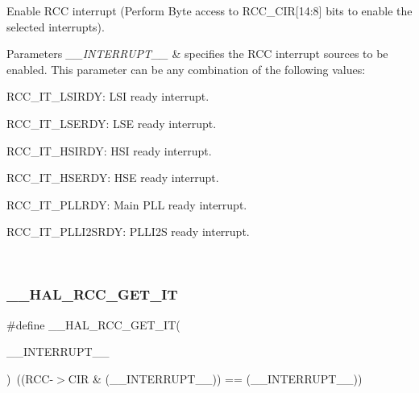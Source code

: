 Enable R\+CC interrupt (Perform Byte access to R\+C\+C\+\_\+\+C\+IR\mbox{[}14\+:8\mbox{]} bits to enable the selected interrupts). 


\begin{DoxyParams}{Parameters}
{\em \+\_\+\+\_\+\+I\+N\+T\+E\+R\+R\+U\+P\+T\+\_\+\+\_\+} & specifies the R\+CC interrupt sources to be enabled. This parameter can be any combination of the following values\+: \begin{DoxyItemize}
\item R\+C\+C\+\_\+\+I\+T\+\_\+\+L\+S\+I\+R\+DY\+: L\+SI ready interrupt. \item R\+C\+C\+\_\+\+I\+T\+\_\+\+L\+S\+E\+R\+DY\+: L\+SE ready interrupt. \item R\+C\+C\+\_\+\+I\+T\+\_\+\+H\+S\+I\+R\+DY\+: H\+SI ready interrupt. \item R\+C\+C\+\_\+\+I\+T\+\_\+\+H\+S\+E\+R\+DY\+: H\+SE ready interrupt. \item R\+C\+C\+\_\+\+I\+T\+\_\+\+P\+L\+L\+R\+DY\+: Main P\+LL ready interrupt. \item R\+C\+C\+\_\+\+I\+T\+\_\+\+P\+L\+L\+I2\+S\+R\+DY\+: P\+L\+L\+I2S ready interrupt. \end{DoxyItemize}
\\
\hline
\end{DoxyParams}
\mbox{\label{group___r_c_c___flags___interrupts___management_ga134af980b892f362c05ae21922cd828d}} 
\subsubsection{\texorpdfstring{\+\_\+\+\_\+\+H\+A\+L\+\_\+\+R\+C\+C\+\_\+\+G\+E\+T\+\_\+\+IT}{\_\_HAL\_RCC\_GET\_IT}}
{\footnotesize\ttfamily \#define \+\_\+\+\_\+\+H\+A\+L\+\_\+\+R\+C\+C\+\_\+\+G\+E\+T\+\_\+\+IT(\begin{DoxyParamCaption}\item[{}]{\+\_\+\+\_\+\+I\+N\+T\+E\+R\+R\+U\+P\+T\+\_\+\+\_\+ }\end{DoxyParamCaption})~((R\+CC-\/$>$C\+IR \& (\+\_\+\+\_\+\+I\+N\+T\+E\+R\+R\+U\+P\+T\+\_\+\+\_\+)) == (\+\_\+\+\_\+\+I\+N\+T\+E\+R\+R\+U\+P\+T\+\_\+\+\_\+))}



